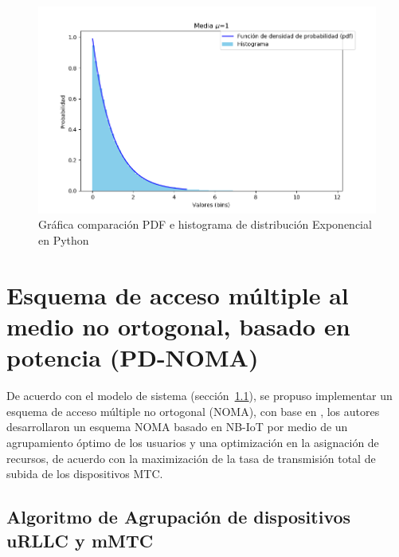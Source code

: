 \begin{figure}[th]
    \centering
    \includegraphics[scale=.7]{Figures/ExponentialDisitribution}
    \decoRule
    \caption[Gráfica comparación PDF e histograma de distribución Exponencial en Python]{Gráfica comparación PDF e histograma de distribución Exponencial en Python}
    \label{fig:generacionExpon}
\end{figure}

\section{Esquema de acceso múltiple al medio no ortogonal, basado en potencia (PD-NOMA)}

De acuerdo con el modelo de sistema (sección~\ref{}), se propuso implementar un esquema de acceso múltiple no ortogonal (NOMA), con base en \parencite{Shahini2019}, los autores desarrollaron un esquema NOMA basado en NB-IoT por medio de un agrupamiento óptimo de los usuarios y una optimización en la asignación de recursos, de acuerdo con la maximización de la tasa de transmisión total de subida de los dispositivos MTC.\newline

\subsection{Algoritmo de Agrupación de dispositivos uRLLC  y mMTC}

